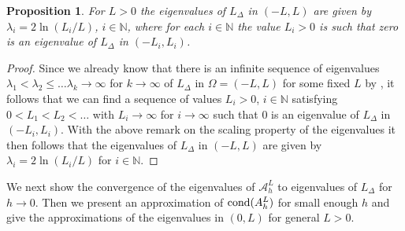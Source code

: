 \documentclass[10 pt]{article}
\newtheorem{proposition}[theorem]{Proposition}
\numberwithin{equation}{section}
\def\N{\mathbb{N}}
\def\R{\mathbb{R}}
\newcommand{\SJ}[1]{{\color{ForestGreen} #1}}  %
\begin{document}
\SJ{
\begin{proposition}\label{eigenvalue approximation a}
For $L>0$ the eigenvalues of $L_{\Delta}$ in $(-L,L)$ are given by $\lambda_i=2\ln(L_i/L)$, $i\in \N$, where for each $i\in \N$ the value $L_i>0$ is such that zero is an eigenvalue of $L_{\Delta}$ in $(-L_i,L_i)$.
\end{proposition}
\begin{proof}
Since we already know that there is an infinite sequence of eigenvalues $\lambda_1<\lambda_2\leq\ldots\lambda_k\to \infty$ for $k\to\infty$ of $L_{\Delta}$ in $\Omega=(-L,L)$ for some fixed $L$ by \cite[Theorem 1.4]{CW19}, it follows that we can find a sequence of values $L_i>0$, $i\in \N$ satisfying $0<L_1<L_2<\ldots$ with $L_i\to\infty$ for $i\to \infty$ such that $0$ is an eigenvalue of $L_{\Delta}$ in $(-L_i,L_i)$. With the above remark on the scaling property of the eigenvalues it then follows that the eigenvalues of $L_{\Delta}$ in $(-L,L)$ are given by $\lambda_i=2\ln(L_i/L)$ for $i\in \N$.
\end{proof}
}

We next show the convergence of the eigenvalues of $\mathcal{A}^L_h$ to eigenvalues of $L_{\Delta}$ for $h\to 0$. Then we present an approximation of $\textnormal{cond}(A^L_h)$ for small enough $h$ and give the approximations of the eigenvalues in $(0,L)$ for general $L>0$.\\
\end{document}
